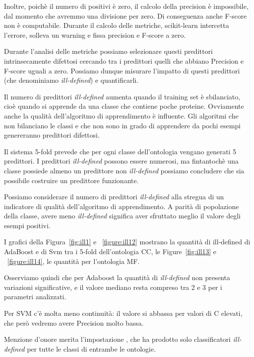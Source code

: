 \documentclass[12pt,a4paper,oneside,hidelinks]{report}
\begin{document}
Inoltre, poichè il numero di positivi è zero, il calcolo della precision è impossibile, dal momento che avremmo una divisione per zero. Di conseguenza anche F-score non è computabile. Durante il calcolo delle metriche, scikit-learn intercetta l'errore, solleva un warning e fissa precision e F-score a zero. 

Durante l'analisi delle metriche possiamo selezionare questi predittori intrinsecamente difettosi cercando tra i predittori quelli che abbiano Precision e F-score uguali a zero. Possiamo dunque misurare l'impatto di questi predittori (che denominiamo \emph{ill-defined}) e quantificarli.

Il numero di predittori \emph{ill-defined} aumenta quando il training set è sbilanciato, cioè quando si apprende da una classe che contiene poche proteine. Ovviamente anche la qualità dell'algoritmo di apprendimento è influente. Gli algoritmi che non bilanciano le classi e che non sono in grado di apprendere da pochi esempi genereranno predittori difettosi.

Il sistema 5-fold prevede che per ogni classe dell'ontologia vengano generati 5 predittori. I predittori \emph{ill-defined} possono essere numerosi, ma fintantochè una classe possiede almeno un predittore non \emph{ill-defined} possiamo concludere che sia possibile costruire un predittore funzionante.

Possiamo considerare il numero di predittori \emph{ill-defined} alla stregua di un indicatore di qualità dell'algoritmo di apprendimento. A parità di popolazione della classe, avere meno \emph{ill-defined} significa aver sfruttato meglio il valore degli esempi positivi.

I grafici della Figura~\ref{fig:ill1} e ~\ref{figure:ill12} mostrano la quantità di ill-defined di AdaBoost e di Svm tra i 5-fold dell'ontologia CC, le Figure~\ref{fig:ill13} e ~\ref{figure:ill14}, le quantità per l'ontologia MF.

Osserviamo quindi che per Adaboost la quantità di \emph{ill-defined} non presenta variazioni significative, e il valore mediano resta compreso tra 2 e 3 per i parametri analizzati.

Per SVM c'è molta meno continuità: il valore si abbassa per valori di C elevati, che però vedremo avere Precision molto bassa.

Menzione d'onore merita l'impostazione , che ha prodotto solo classificatori \emph{ill-defined} per tutte le classi di entrambe le ontologie.
\end{document}
